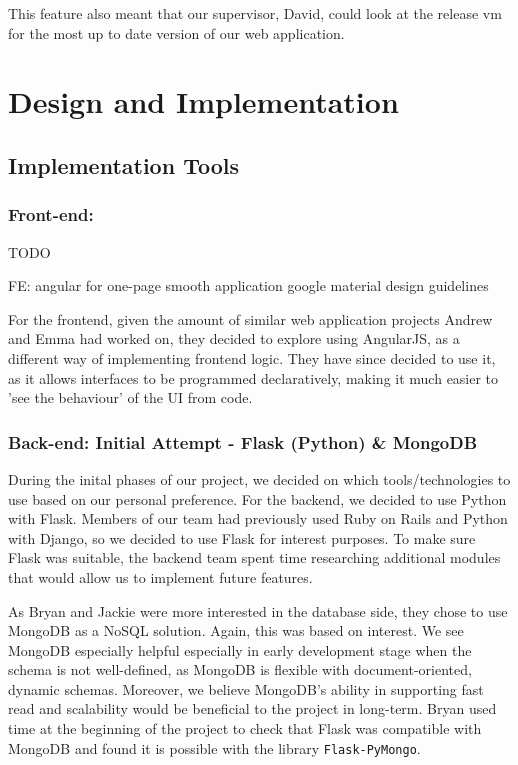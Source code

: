 \documentclass[a4paper, titlepage]{article}
\begin{document}
This feature also meant that our supervisor, David, could look at the release vm 
for the most up to date version of our web application. 


\newpage
\section{Design and Implementation}

\subsection{Implementation Tools}

\subsubsection{Front-end: }
TODO 

FE: 
  angular for one-page smooth application
  google material design guidelines

For the frontend, given the amount of similar web application projects Andrew and Emma had worked on, they decided to explore using AngularJS, as a different way of implementing frontend logic. They have since decided to use it, as it allows interfaces to be programmed declaratively, making it much easier to 'see the behaviour' of the UI from code.


\subsubsection{Back-end: Initial Attempt - Flask (Python) \& MongoDB}

During the inital phases of our project, we decided on which tools/technologies to use based on our personal preference. For the backend, we decided to use Python with Flask. Members of our team had previously used Ruby on Rails and Python with Django, so we decided to use Flask for interest purposes. To make sure Flask was suitable, the backend team spent time researching additional modules that would allow us to implement future features.


As Bryan and Jackie were more interested in the database side, they chose to use MongoDB as a NoSQL
solution. Again, this was based on interest. We see MongoDB especially helpful especially in early
development stage when the schema is not well-defined, as MongoDB is flexible with document-oriented,
dynamic schemas. Moreover, we believe MongoDB's ability in supporting fast read and scalability would be
beneficial to the project in long-term. Bryan used time at the beginning of the project to check that 
Flask was compatible with MongoDB and found it is possible with the library \texttt{Flask-PyMongo}.
\end{document}
